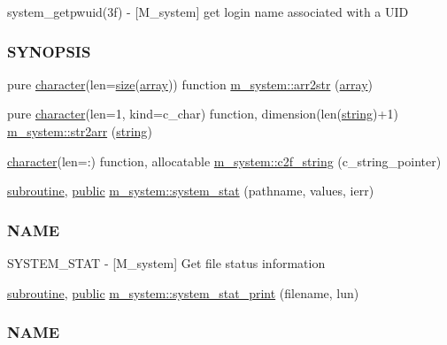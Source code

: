 \begin{DoxyCompactItemize}
\begin{DoxyCompactList}
system\+\_\+getpwuid(3f) -\/ \mbox{[}M\+\_\+system\mbox{]} get login name associated with a U\+ID \subsubsection*{S\+Y\+N\+O\+P\+S\+IS}\end{DoxyCompactList}\item 
pure \hyperlink{option__stopwatch_83_8txt_abd4b21fbbd175834027b5224bfe97e66}{character}(len=\hyperlink{what__overview_81_8txt_ab5692ed87074f1d5ec850a9ffa8b5af9}{size}(\hyperlink{intro__blas1_83_8txt_a89db1945e1a335ab0184c6a097821e32}{array})) function \hyperlink{namespacem__system_aeb3d7d4cb39d59917910a3ae2532206d}{m\+\_\+system\+::arr2str} (\hyperlink{intro__blas1_83_8txt_a89db1945e1a335ab0184c6a097821e32}{array})
\item 
pure \hyperlink{option__stopwatch_83_8txt_abd4b21fbbd175834027b5224bfe97e66}{character}(len=1, kind=c\+\_\+char) function, dimension(len(\hyperlink{what__overview_81_8txt_a74cb7e955273b9f9157b4f0c18a38849}{string})+1) \hyperlink{namespacem__system_af7e778ffc24aa7bc00b842a8e673aeaa}{m\+\_\+system\+::str2arr} (\hyperlink{what__overview_81_8txt_a74cb7e955273b9f9157b4f0c18a38849}{string})
\item 
\hyperlink{option__stopwatch_83_8txt_abd4b21fbbd175834027b5224bfe97e66}{character}(len=\+:) function, allocatable \hyperlink{namespacem__system_aa7c5445619aa15cd2301fe17f7c3b73c}{m\+\_\+system\+::c2f\+\_\+string} (c\+\_\+string\+\_\+pointer)
\item 
\hyperlink{M__stopwatch_83_8txt_acfbcff50169d691ff02d4a123ed70482}{subroutine}, \hyperlink{M__stopwatch_83_8txt_a2f74811300c361e53b430611a7d1769f}{public} \hyperlink{namespacem__system_a5bb1ebcebe181e07fd24e908cacc9887}{m\+\_\+system\+::system\+\_\+stat} (pathname, values, ierr)
\begin{DoxyCompactList}\small\item\em \subsubsection*{N\+A\+ME}

S\+Y\+S\+T\+E\+M\+\_\+\+S\+T\+AT -\/ \mbox{[}M\+\_\+system\mbox{]} Get file status information \end{DoxyCompactList}\item 
\hyperlink{M__stopwatch_83_8txt_acfbcff50169d691ff02d4a123ed70482}{subroutine}, \hyperlink{M__stopwatch_83_8txt_a2f74811300c361e53b430611a7d1769f}{public} \hyperlink{namespacem__system_aa26c234da8b559f549db4dbe446b8acc}{m\+\_\+system\+::system\+\_\+stat\+\_\+print} (filename, lun)
\begin{DoxyCompactList}\small\item\em \subsubsection*{N\+A\+ME}


\end{DoxyCompactList}
\end{DoxyCompactItemize}
